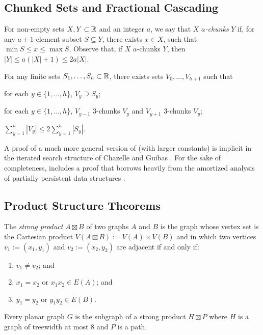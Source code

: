\documentclass[kpfonts]{patmorin}
\begin{document}
\subsection{Chunked Sets and Fractional Cascading}

For non-empty sets $X,Y\subset \mathbb{R}$ and an integer $a$, we say that $X$ \emph{$a$-chunks} $Y$ if, for any $a+1$-element subset $S\subseteq Y$, there exists $x\in X$, such that $\min S\le x\le \max S$. Observe that, if $X$ $a$-chunks $Y$, then $|Y|\le a(|X|+1)\le 2a|X|$.

\begin{lem}
  For any finite sets $S_1,\ldots,S_h\subset\mathbb{R}$, there exists sets $V_0,\ldots,V_{h+1}$ such that
  \begin{compactenum}
    \item for each $y\in\{1,\ldots,h\}$, $V_y\supseteq S_y$;
    \item for each $y\in\{1,\ldots,h\}$, $V_{y-1}$ 3-chunks $V_y$ and $V_{y+1}$ 3-chunks $V_y$;
    \item $\sum_{y=1}^h |V_y|\le 2\sum_{y=1}^h |S_y|$.
  \end{compactenum}
\end{lem}

A proof of a much more general version of  (with larger constants) is implicit in the iterated search structure of Chazelle and Guibas \cite{chazelle.guibas:fractional1}.   For the sake of completeness,  includes a proof that borrows heavily from the amortized analysis of partially persistent data structures \cite[Section~2.3]{driscoll.sarnak.ea:making}.


\subsection{Product Structure Theorems}

The \emph{strong product} $A\boxtimes B$ of two graphs $A$ and $B$ is the graph whose vertex set is the Cartesian product $V(A\boxtimes B):=V(A)\times V(B)$ and in which two vertices $v_1:=(x_1,y_1)$ and $v_2:=(x_2,y_2)$ are adjacent if and only if:
\begin{enumerate}
  \item  $v_1\neq v_2$; and
  \item $x_1=x_2$ or $x_1x_2\in E(A)$; and
  \item $y_1=y_2$ or $y_1y_2\in E(B)$.
\end{enumerate}

\begin{thm}
  Every planar graph $G$ is the subgraph of a strong product $H\boxtimes P$ where $H$ is a graph of treewidth at most 8 and $P$ is a path.
\end{thm}
\end{document}
